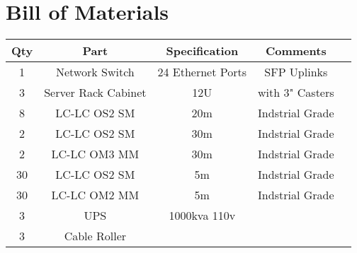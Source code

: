 \newpage

\section{Bill of Materials}

\begin{tabular}{|c|c|c|c|c|}
  \hline
  Qty & Part  & Specification &  Comments \\ 
  \hline


  1 & Network Switch & 24 Ethernet Ports &  SFP Uplinks \\ 
  \hline

  3 & Server Rack Cabinet& 12U & with 3" Casters  \\ 
  \hline

  8 & LC-LC OS2 SM & 20m & Indstrial Grade  \\ 
  \hline

  2 & LC-LC OS2 SM & 30m & Indstrial Grade  \\ 
  \hline

  2 & LC-LC OM3 MM & 30m & Indstrial Grade  \\ 
  \hline

  30 & LC-LC OS2 SM & 5m & Indstrial Grade  \\ 
  \hline

  30 & LC-LC OM2 MM & 5m & Indstrial Grade  \\ 
  \hline

    
  3 &  UPS & 1000kva 110v   &  \\ 
  \hline
  
  3 & Cable Roller  &   &     \\ 
  \hline


  \end{tabular}